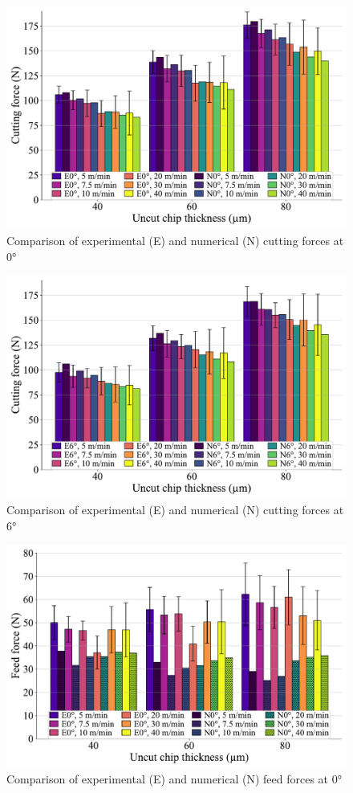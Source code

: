 \documentclass[final,5p,times,twocolumn]{elsarticle}
\begin{document}
\begin{figure}[h]
\centering
\includegraphics{Figures/Fx_0}
\caption{Comparison of experimental (E) and numerical (N) cutting forces at 0°}
\label{Fx_0}
\end{figure}

\begin{figure}[h]
\centering
\includegraphics{Figures/Fx_6}
\caption{Comparison of experimental (E) and numerical (N) cutting forces at 6°}
\label{Fx_6}
\end{figure}

\begin{figure}[h]
\centering
\includegraphics{Figures/Fy_0}
\caption{Comparison of experimental (E) and numerical (N) feed forces at 0°}
\label{Fy_0}
\end{figure}
\end{document}
